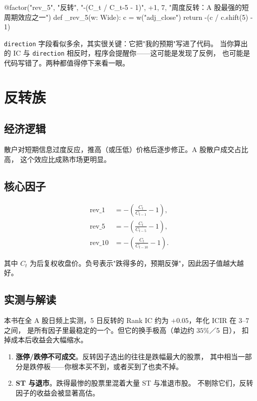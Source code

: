 \begin{pycode}[因子注册表机制]
@factor("rev_5", "反转", "-(C_t / C_{t-5} - 1)", +1, 7,
        "周度反转：A 股最强的短周期效应之一")
def _rev_5(w: Wide):
    c = w("adj_close")
    return -(c / c.shift(5) - 1)
\end{pycode}

\texttt{direction} 字段看似多余，其实很关键：它把"我的预期"写进了代码。
当你算出的 IC 与 \texttt{direction} 相反时，程序会提醒你——这可能是发现了反例，
也可能是代码写错了。两种都值得停下来看一眼。

\section{反转族}

\subsection{经济逻辑}

散户对短期信息过度反应，推高（或压低）价格后逐步修正。A 股散户成交占比高，
这个效应比成熟市场更明显。

\subsection{核心因子}

\begin{align}
  \text{rev\_1} &= -\left(\frac{C_t}{C_{t-1}} - 1\right), \\
  \text{rev\_5} &= -\left(\frac{C_t}{C_{t-5}} - 1\right), \\
  \text{rev\_10} &= -\left(\frac{C_t}{C_{t-10}} - 1\right).
\end{align}

其中 $C_t$ 为后复权收盘价。负号表示"跌得多的，预期反弹"，因此因子值越大越好。

\subsection{实测与解读}

本书在全 A 股日频上实测，5 日反转的 Rank IC 约为 $+0.05$，年化 ICIR 在 $3$--$7$ 之间，
是所有因子里最稳定的一个。但它的换手极高（单边约 $35\%$／5 日），
扣掉成本后收益会大幅缩水。

\begin{warnbox}[反转因子的两个陷阱]
\begin{enumerate}
  \item \textbf{涨停/跌停不可成交}。反转因子选出的往往是跌幅最大的股票，
        其中相当一部分是跌停板——你根本买不到，或者买到了也卖不掉。
  \item \textbf{ST 与退市}。跌得最惨的股票里混着大量 ST 与准退市股。
        不剔除它们，反转因子的收益会被显著高估。
\end{enumerate}
\end{warnbox}

